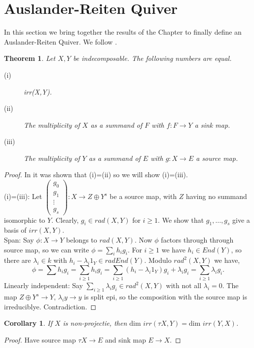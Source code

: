 \documentclass[11.5pt, twoside, a4paper, titlepage]{report}
\theoremstyle{definition}
\theoremstyle{plain}
\newtheorem{thm}[mydef]{Theorem}
\newtheorem{cor}[mydef]{Corollary}
\begin{document}
\section{Auslander-Reiten Quiver}

In this section we bring together the results of the Chapter to finally define an Auslander-Reiten Quiver. We follow \cite{CB3}.

\begin{thm} \label{irrthm}
Let $X,Y$ be indecomposable. The following numbers are equal.
\begin{description}
\item [(i)] irr(X,Y).
\item [(ii)] The multiplicity of $X$ as a summand of $F$ with $f:F\to Y$ a sink map.
\item [(iii)] The multiplicity of $Y$ as a summand of $E$ with $g:X \to E$ a source map.
\end{description}
\end{thm}
\begin{proof}
In \cite{CB3} it was shown that (i)=(ii) so we will show (i)=(iii).\\
(i)=(iii): Let $\left(\begin{smallmatrix}g_0 \\ g_1 \\ \vdots \\ g_s \end{smallmatrix}\right): X \to Z\oplus Y^s$ be a source map, with $Z$ having no summand isomorphic to $Y$. Clearly, $g_i \in rad(X,Y)$ for $i\geq 1$. We show that $g_1, \dots, g_s$ give a basis of $irr(X,Y)$. \\
Span: Say $\phi: X \to Y$ belongs to $rad(X,Y)$. Now $\phi$ factors through through source map, so we can write $\phi=\sum_i h_ig_i$. For $i\geq 1$ we have $h_i\in End(Y)$, so there are $\lambda_i \in k$ with $h_i-\lambda_i1_Y \in rad End(Y)$. Modulo $rad^2(X,Y)$ we have,
\begin{equation*}
\phi=\sum h_ig_i=\sum_{i\geq 1}h_ig_i=\sum_{i\geq 1}(h_i - \lambda_i1_Y)g_i + \lambda_ig_i=\sum_{i\geq 1}\lambda_ig_i.
\end{equation*}
Linearly independent: Say $\sum_{i\geq 1} \lambda_ig_i \in rad^2(X,Y)$ with not all $\lambda_i=0$. The map $Z \oplus Y^s \to Y$, $\lambda_iy \to y$ is split epi, so the composition with the source map is irreduciblye. Contradiction.
\end{proof}

\begin{cor}
If $X$ is non-projectie, then $\text{dim }irr(\tau X, Y)=\text{dim }irr(Y,X)$.
\end{cor}
\begin{proof}
Have source map $\tau X \to E$ and sink map $E \to X$.
\end{proof}
\end{document}
